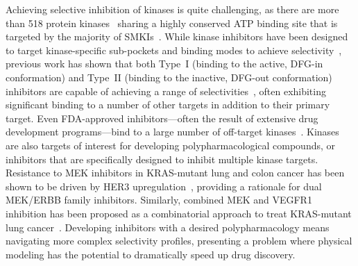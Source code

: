 \documentclass[phd,tocprelim]{cornell}
\begin{document}
Achieving selective inhibition of kinases is quite challenging, as there are more than 518 protein kinases~\citep{Volkamer2015-jx,Manning2002-cw} sharing a highly conserved ATP binding site that is targeted by the majority of SMKIs~\citep{Wu2015-oq}.
While kinase inhibitors have been designed to target kinase-specific sub-pockets and binding modes to achieve selectivity~\citep{Cowan-Jacob2007-rn,Seeliger2007-jn,Huse2002-ml,Harrison2003-ct,Volkamer2016-sj,ChristmannFranck:2016gka}, previous work has shown that both Type~I (binding to the active, DFG-in conformation) and Type~II (binding to the inactive, DFG-out conformation) inhibitors are capable of achieving a range of selectivities~\citep{Anastassiadis2011-sm,Davis:Nat.Biotechnol.:2011}, often exhibiting significant binding to a number of other targets in addition to their primary target. 
Even FDA-approved inhibitors---often the result of extensive drug development programs---bind to a large number of off-target kinases~\citep{Klaeger2017-jr}.
Kinases are also targets of interest for developing polypharmacological compounds, or inhibitors that are specifically designed to inhibit multiple kinase targets. 
Resistance to MEK inhibitors in KRAS-mutant lung and colon cancer has been shown to be driven by HER3 upregulation~\citep{Sun:2014kt}, providing a rationale for dual MEK/ERBB family inhibitors. 
Similarly, combined MEK and VEGFR1 inhibition has been proposed as a combinatorial approach to treat KRAS-mutant lung cancer~\citep{Manchado:2016fb}. 
Developing inhibitors with a desired polypharmacology means navigating more complex selectivity profiles, presenting a problem where physical modeling has the potential to dramatically speed up drug discovery. 
\end{document}
